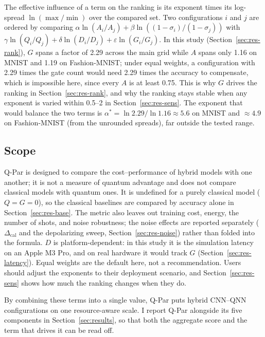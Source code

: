\documentclass{ieeeaccess}
\newcommand{\Dcal}{\Delta_{\mathrm{cal}}}
\begin{document}
The effective influence of a term on the ranking is its exponent times its log-spread $\ln(\max/\min)$ over the compared set. Two configurations $i$ and $j$ are ordered by comparing $\alpha\ln(A_i/A_j) + \beta\ln((1-\sigma_i)/(1-\sigma_j))$ with $\gamma\ln(Q_i/Q_j) + \delta\ln(D_i/D_j) + \varepsilon\ln(G_i/G_j)$. In this study (Section~\ref{sec:res-rank}), $G$ spans a factor of 2.29 across the main grid while $A$ spans only 1.16 on MNIST and 1.19 on Fashion-MNIST; under equal weights, a configuration with 2.29 times the gate count would need 2.29 times the accuracy to compensate, which is impossible here, since every $A$ is at least 0.75. This is why $G$ drives the ranking in Section~\ref{sec:res-rank}, and why the ranking stays stable when any exponent is varied within 0.5--2 in Section~\ref{sec:res-sens}. The exponent that would balance the two terms is $\alpha^* = \ln 2.29 / \ln 1.16 \approx 5.6$ on MNIST and $\approx 4.9$ on Fashion-MNIST (from the unrounded spreads), far outside the tested range.

\subsection{Scope}
\label{sec:qpar-scope}

Q-Par is designed to compare the cost--performance of hybrid models with one another; it is not a measure of quantum advantage and does not compare classical models with quantum ones. It is undefined for a purely classical model ($Q = G = 0$), so the classical baselines are compared by accuracy alone in Section~\ref{sec:res-base}. The metric also leaves out training cost, energy, the number of shots, and noise robustness; the noise effects are reported separately ($\Dcal$ and the depolarizing sweep, Section~\ref{sec:res-noise}) rather than folded into the formula. $D$ is platform-dependent: in this study it is the simulation latency on an Apple M3 Pro, and on real hardware it would track $G$ (Section~\ref{sec:res-latency}). Equal weights are the default here, not a recommendation. Users should adjust the exponents to their deployment scenario, and Section~\ref{sec:res-sens} shows how much the ranking changes when they do.

By combining these terms into a single value, Q-Par puts hybrid CNN--QNN configurations on one resource-aware scale. I report Q-Par alongside its five components in Section~\ref{sec:results}, so that both the aggregate score and the term that drives it can be read off.

\end{document}
